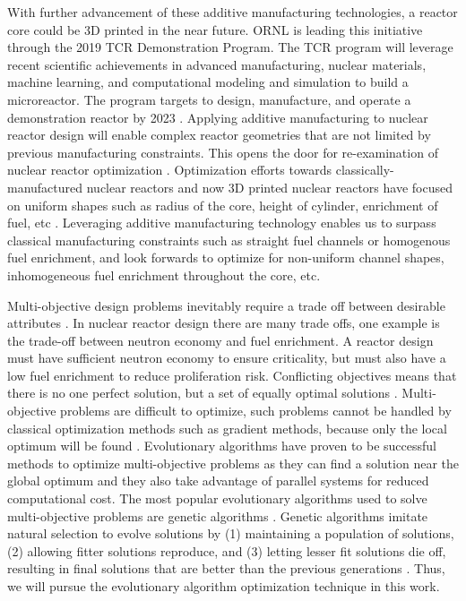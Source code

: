 With further advancement of these additive manufacturing technologies, a reactor 
core could be 3D printed in the near future. 
\gls{ORNL} is leading this initiative through the 2019 \gls{TCR} Demonstration 
Program. 
The \gls{TCR} program will leverage recent scientific achievements in advanced 
manufacturing, nuclear materials, machine learning, and computational modeling 
and simulation to build a microreactor. 
The program targets to design, manufacture, and operate a demonstration reactor 
by 2023 \cite{terrani_transformational_2019}. 
Applying additive manufacturing to nuclear reactor design will enable complex 
reactor geometries that are not limited by previous manufacturing constraints. 
This opens the door for re-examination of nuclear reactor optimization 
\cite{sobes_artificial_2020}. 
Optimization efforts towards classically-manufactured nuclear reactors and now
3D printed nuclear reactors have focused on uniform shapes such as radius of the 
core, height of cylinder, enrichment of fuel, etc 
\cite{sobes_artificial_2020,sacco_two_2006,kumar_new_2015,pereira_parallel_2008}. 
Leveraging additive manufacturing technology enables us to surpass classical 
manufacturing constraints such as straight fuel channels or homogenous fuel enrichment, 
and look forwards to optimize for non-uniform channel shapes, inhomogeneous 
fuel enrichment throughout the core, etc. 

Multi-objective design problems inevitably require a trade off between 
desirable attributes \cite{byrne_evolving_2014,simon_sciences_2019}. 
In nuclear reactor design there are many trade offs, one example is the 
trade-off between neutron economy and fuel enrichment. 
A reactor design must have sufficient neutron economy to ensure criticality, 
but must also have a low fuel enrichment to reduce proliferation risk.
Conflicting objectives means that there is no one perfect solution, but a set
of equally optimal solutions \cite{byrne_evolving_2014}.
Multi-objective problems are difficult to optimize, such problems 
cannot be handled by classical optimization methods such as gradient 
methods, because only the local optimum will be found \cite{renner_genetic_2003}. 
Evolutionary algorithms have proven to be successful 
methods to optimize multi-objective problems \cite{krish_practical_2011} as 
they can find a solution near the global optimum \cite{renner_genetic_2003}
and they also take advantage of parallel systems for reduced computational 
cost. 
The most popular evolutionary algorithms used to solve multi-objective 
problems are genetic algorithms 
\cite{byrne_evolving_2014, krish_practical_2011}. 
Genetic algorithms imitate natural selection to evolve solutions 
by (1) maintaining a population of solutions, (2) allowing 
fitter solutions reproduce, and (3) letting lesser fit solutions die off, 
resulting in final solutions that are better than the previous generations 
\cite{renner_genetic_2003}. 
Thus, we will pursue the evolutionary algorithm optimization technique 
in this work. 

